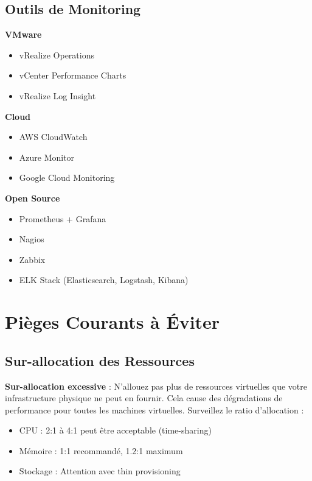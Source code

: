 \documentclass[11pt,a4paper]{article}
\begin{document}
\subsection{Outils de Monitoring}

\textbf{VMware}
\begin{itemize}
    \item vRealize Operations
    \item vCenter Performance Charts
    \item vRealize Log Insight
\end{itemize}

\textbf{Cloud}
\begin{itemize}
    \item AWS CloudWatch
    \item Azure Monitor
    \item Google Cloud Monitoring
\end{itemize}

\textbf{Open Source}
\begin{itemize}
    \item Prometheus + Grafana
    \item Nagios
    \item Zabbix
    \item ELK Stack (Elasticsearch, Logstash, Kibana)
\end{itemize}

\section{Pièges Courants à Éviter}

\subsection{Sur-allocation des Ressources}

\begin{dangerbox}
\textbf{Sur-allocation excessive} : N'allouez pas plus de ressources virtuelles que votre infrastructure physique ne peut en fournir. Cela cause des dégradations de performance pour toutes les machines virtuelles. Surveillez le ratio d'allocation :
\begin{itemize}
    \item CPU : 2:1 à 4:1 peut être acceptable (time-sharing)
    \item Mémoire : 1:1 recommandé, 1.2:1 maximum
    \item Stockage : Attention avec thin provisioning
\end{itemize}
\end{dangerbox}
\end{document}
